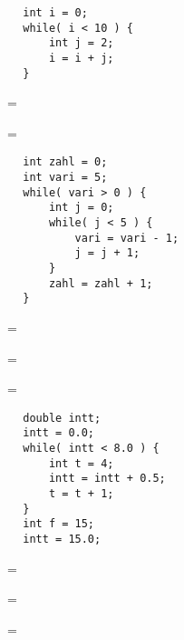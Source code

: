 \documentclass[10pt, a4paper, ngerman]{arbeitsblatt}
\begin{document}
\begin{aufgabe}
\begin{enuma}
	\item
	\begin{links}[.69]
		\begin{verbatim}
		int i = 0;
		while( i < 10 ) {
			int j = 2;
			i = i + j;
		}
		\end{verbatim}
	\end{links}\begin{rechts}[.29]
		\begin{description}
			\item[] =
			\item[] =
		\end{description}
	\end{rechts}

	\item
	\begin{links}[.69]
		\begin{verbatim}
		int zahl = 0;
		int vari = 5;
		while( vari > 0 ) {
			int j = 0;
			while( j < 5 ) {
				vari = vari - 1;
				j = j + 1;
			}
			zahl = zahl + 1;
		}
		\end{verbatim}
	\end{links}\begin{rechts}[.29]
		\begin{description}
			\item[] =
			\item[] =
			\item[] =
		\end{description}
	\end{rechts}

	\item
	\begin{links}[.69]
		\begin{verbatim}
		double intt;
		intt = 0.0;
		while( intt < 8.0 ) {
			int t = 4;
			intt = intt + 0.5;
			t = t + 1;
		}
		int f = 15;
		intt = 15.0;
		\end{verbatim}
	\end{links}\begin{rechts}[.29]
		\begin{description}
			\item[] =
			\item[] =
			\item[] =
		\end{description}
	\end{rechts}
\end{enuma}
\end{aufgabe}
\end{document}
